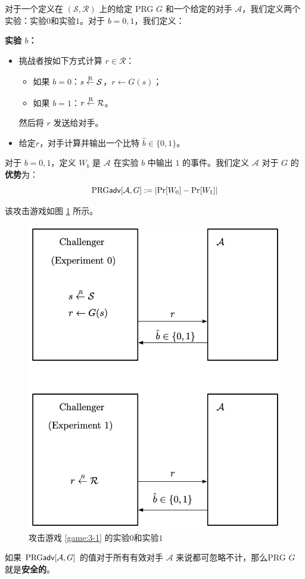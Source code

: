 \begin{game}[伪随机生成器]\label{game:3-1}
对于一个定义在 $(\mathcal{S},\mathcal{R})$ 上的给定 PRG $G$ 和一个给定的对手 $\mathcal{A}$，我们定义两个实验：实验$0$和实验$1$。对于 $b=0,1$，我们定义：

\noindent\textbf{实验 $b$：}
\begin{itemize}
	\item 挑战者按如下方式计算 $r\in\mathcal{R}$：
	\begin{itemize}
		\item 如果 $b=0$：$s\overset{\rm R}\leftarrow\mathcal{S}$，$r\leftarrow G(s)$；
		\item 如果 $b=1$：$r\overset{\rm R}\leftarrow\mathcal{R}$。
	\end{itemize}
	然后将 $r$ 发送给对手。
	\item 给定$r$，对手计算并输出一个比特 $\hat{b}\in\{0,1\}$。
\end{itemize}

对于 $b=0,1$，定义 $W_b$ 是 $\mathcal{A}$ 在实验 $b$ 中输出 $1$ 的事件。我们定义 $\mathcal{A}$ 对于 $G$ 的\textbf{优势}为：
$$
{\rm PRG\mathsf{adv}}[\mathcal{A},G]:=|{\rm Pr}[W_0]-{\rm Pr}[W_1]|
$$
\end{game}

该攻击游戏如图 \ref{fig:3-1} 所示。

\begin{figure}
  \centering
  \includegraphics[width=0.5\linewidth]{figures/chapter3/fig1.png}
  \caption{攻击游戏 \ref{game:3-1} 的实验$0$和实验$1$}
  \label{fig:3-1}
\end{figure}

\begin{definition}\label{def:3-1}
如果 ${\rm PRG\mathsf{adv}}[\mathcal{A},G]$ 的值对于所有有效对手 $\mathcal{A}$ 来说都可忽略不计，那么PRG $G$ 就是\textbf{安全的}。

\end{definition}

